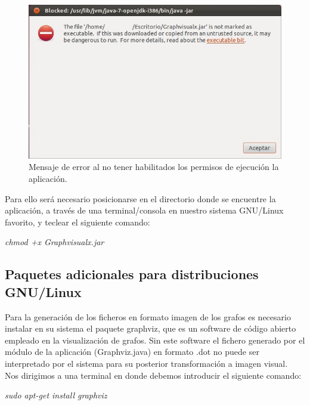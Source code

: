 \begin{figure}[H]
\begin{center}
\includegraphics[width=16cm]{./imagenes_documentacion/captura_error_ejecucion_jar.jpeg}
\caption{Mensaje de error al no tener habilitados los permisos de ejecución la aplicación.}
\end{center}
\end{figure}

Para ello será necesario posicionarse en el directorio donde se encuentre la aplicación, a través de una terminal/consola en nuestro sistema GNU/Linux favorito, y teclear el siguiente comando:\\

\begin{center} \emph{chmod +x Graphvisualx.jar} \\ \end{center}

\subsection{Paquetes adicionales para distribuciones GNU/Linux}

Para la generación de los ficheros en formato imagen de los grafos es necesario instalar en su sistema el paquete graphviz, que es un software de código abierto empleado en la visualización de grafos. Sin este software el fichero generado por el módulo de la aplicación (Graphviz.java) en formato .dot no puede ser interpretado por el sistema para su posterior transformación a imagen visual.\\

Nos dirigimos a una terminal en donde debemos introducir el siguiente comando:

\begin{center} \emph{sudo apt-get install graphviz} \\ \end{center}

